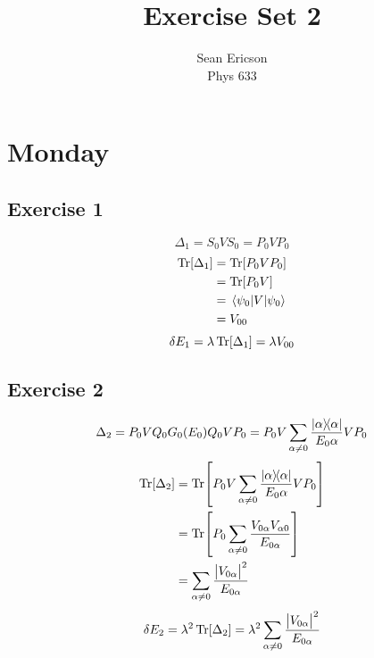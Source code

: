 \documentclass[12pt]{article}
\newcommand{\magsq}[1]{\big|#1\big|^2}
\begin{document}
	
\title{Exercise Set 2}
\author{Sean Ericson \\ Phys 633}
\maketitle

\section*{Monday}
\subsection*{Exercise 1}
\[ \Delta_1 = S_0VS_0 = P_0VP_0 \]
\begin{align*}
    \Tr[\Delta_1] &= \Tr[P_0VP_0] \\
    &= \Tr[P_0V] \\
    &= \mel{\psi_0}{V}{\psi_0} \\
    &= V_{00}
\end{align*}
\[ \delta E_1 = \lambda \Tr[\Delta_1] = \lambda V_{00} \]

\subsection*{Exercise 2}
\[ \Delta_2 = P_0VQ_0G_0(E_0)Q_0VP_0 = P_0V\sum_{\alpha\neq 0}\frac{\dyad{\alpha}}{E_0\alpha}VP_0 \]
\begin{align*}
    \Tr[\Delta_2] &= \Tr[P_0V\sum_{\alpha\neq 0}\frac{\dyad{\alpha}}{E_0\alpha}VP_0] \\
    &= \Tr[P_0\sum_{\alpha\neq 0}\frac{V_{0\alpha}V_{\alpha 0}}{E_{0\alpha}}] \\
    &= \sum_{\alpha\neq 0}\frac{\magsq{V_{0\alpha}}}{E_{0\alpha}}
\end{align*}
\[ \delta E_2 = \lambda^2 \Tr[\Delta_2] = \lambda^2 \sum_{\alpha\neq 0}\frac{\magsq{V_{0\alpha}}}{E_{0\alpha}} \]
\end{document}
